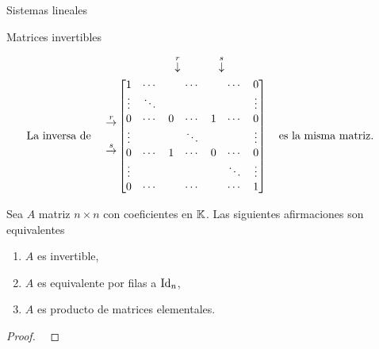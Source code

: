 \begin{chapter}{Sistemas lineales}
\begin{section}{Matrices invertibles}
\begin{ejemplo*}
            \begin{align*}
            &\begin{matrix}
            {}^{}&{}^{}&{}^{}&{}^{}&{}^{}&\overset{r}{\downarrow}&{}^{}&{}^{}&{}^{}{}^{}\overset{s}{\downarrow}&{}^{}
            \end{matrix} \\
            \text{La inversa de \quad}\begin{matrix}
            {}^{}\\{}^{}\\
            \overset{r}{\to}\\
            {}^{}\\
            \overset{s}{\to}\\{}^{}\\
            {}^{}
            \end{matrix}
            &\begin{bmatrix}
            1 & \cdots &  &\cdots &&\cdots& 0  \\
            \vdots  & \ddots  & & &&& \vdots \\
            0 & \cdots &0 &\cdots&1&\cdots &0 \\
            \vdots  &   & &\ddots &&& \vdots \\
            0  & \cdots  &1 &\cdots &0& \cdots& 0 \\
            \vdots  &   & & &&\ddots& \vdots \\
            0  & \cdots  & &\cdots &&\cdots& 1
            \end{bmatrix}
            \text{\quad es la misma matriz.\quad}
            \end{align*}
        
                        
        
    
\end{ejemplo*}
        
        
            
            
            \begin{teorema}\label{mtrx-inv-equiv} Sea $A$ matriz $n \times n$ con coeficientes en $\mathbb K$. Las siguientes afirmaciones son equivalentes
                \begin{enumerate}
                    \item\label{teo-inv-1} $A$ es invertible,
                    \item\label{teo-inv-2} $A$  es equivalente por filas a $\operatorname{Id}_n$, 
                    \item\label{teo-inv-3} $A$ es producto de matrices elementales.
                \end{enumerate}
            \end{teorema}
            \begin{proof}
                \


\end{proof}
\end{section}
\end{chapter}
